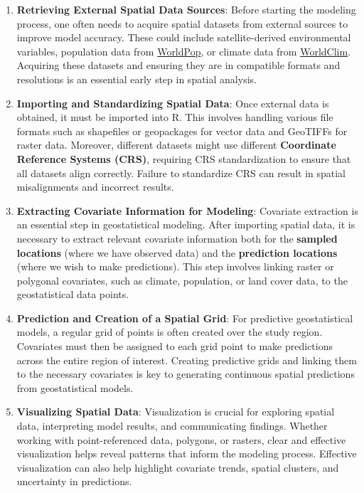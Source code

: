 \documentclass[
  letterpaper,
]{krantz}
\begin{document}
\begin{enumerate}
\def\labelenumi{\arabic{enumi}.}
\item
  \textbf{Retrieving External Spatial Data Sources}: Before starting the
  modeling process, one often needs to acquire spatial datasets from
  external sources to improve model accuracy. These could include
  satellite-derived environmental variables, population data from
  \href{https://www.worldpop.org/}{WorldPop}, or climate data from
  \href{https://www.worldclim.org/}{WorldClim}. Acquiring these datasets
  and ensuring they are in compatible formats and resolutions is an
  essential early step in spatial analysis.
\item
  \textbf{Importing and Standardizing Spatial Data}: Once external data
  is obtained, it must be imported into R. This involves handling
  various file formats such as shapefiles or geopackages for vector data
  and GeoTIFFs for raster data. Moreover, different datasets might use
  different \textbf{Coordinate Reference Systems (CRS)}, requiring CRS
  standardization to ensure that all datasets align correctly. Failure
  to standardize CRS can result in spatial misalignments and incorrect
  results.
\item
  \textbf{Extracting Covariate Information for Modeling}: Covariate
  extraction is an essential step in geostatistical modeling. After
  importing spatial data, it is necessary to extract relevant covariate
  information both for the \textbf{sampled locations} (where we have
  observed data) and the \textbf{prediction locations} (where we wish to
  make predictions). This step involves linking raster or polygonal
  covariates, such as climate, population, or land cover data, to the
  geostatistical data points.
\item
  \textbf{Prediction and Creation of a Spatial Grid}: For predictive
  geostatistical models, a regular grid of points is often created over
  the study region. Covariates must then be assigned to each grid point
  to make predictions across the entire region of interest. Creating
  predictive grids and linking them to the necessary covariates is key
  to generating continuous spatial predictions from geostatistical
  models.
\item
  \textbf{Visualizing Spatial Data}: Visualization is crucial for
  exploring spatial data, interpreting model results, and communicating
  findings. Whether working with point-referenced data, polygons, or
  rasters, clear and effective visualization helps reveal patterns that
  inform the modeling process. Effective visualization can also help
  highlight covariate trends, spatial clusters, and uncertainty in
  predictions.
\end{enumerate}
\end{document}
